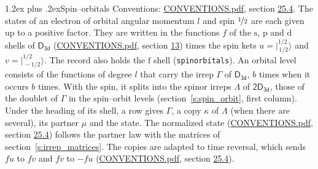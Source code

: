 \documentclass[10pt,a4paper]{article}
\makeatletter
\renewcommand\section{\@startsection{section}{1}{\z@}{-3ex plus -1ex minus -.2ex}%
  {1.2ex plus .2ex}{\normalfont\large\sffamily\bfseries\color{parttitle}}}
\numberwithin{equation}{section}
\newcommand{\grp}[1]{\mathsf{#1}}
\newcommand{\orbital}[1]{\mathrm{#1}}
\newcommand{\mult}{\kappa}
\newcommand{\intx}{\mu}
\newcommand{\jm}[2]{\bigl\lvert{}^{#1}_{\,#2}\bigr\rangle}
\makeatother
\begin{document}
\section{Spin--orbitals}\label{s:spin_orbitals}
Conventions: \href{../../CONVENTIONS.pdf}{CONVENTIONS.pdf}, section \href{../../CONVENTIONS.pdf\#conv.25.4}{25.4}.
\leavevmode\label{n:index.orbital.l}The states of an electron of orbital angular momentum $l$ and spin $\nicefrac{1}{2}$ are each given up to a positive factor. \label{n:local.spinor.uv}\label{n:local.function.f}They are written in the functions $f$ of the $\orbital{s}$, $\orbital{p}$ and $\orbital{d}$ shells of \href{../../../rotation/data/pdf/D3d.pdf}{$\grp{D_{3d}}$} (\href{../../CONVENTIONS.pdf}{CONVENTIONS.pdf}, section \href{../../../rotation/CONVENTIONS.pdf\#conv.13}{13}) times the spin kets $u = \jm{1/2}{1/2}$ and $v = \jm{1/2}{-1/2}$. The record also holds the $\orbital{f}$ shell (\texttt{spinorbitals}). An orbital level consists of the functions of degree $l$ that carry the irrep $\Gamma$ of \href{../../../rotation/data/pdf/D3d.pdf}{$\grp{D_{3d}}$}, $b$ times when it occurs $b$ times. With the spin, it splits into the spinor irreps $\Lambda$ of $\grp{2D_{3d}}$, those of the doublet of $\Gamma$ in the spin--orbit levels (section~\ref{s:spin_orbit}, first column). \label{n:head.state}Under the heading of its shell, a row gives $\Gamma$, a copy $\mult$ of $\Lambda$ (when there are several), its partner $\intx$ and the state. The normalized state (\href{../../CONVENTIONS.pdf}{CONVENTIONS.pdf}, section \href{../../CONVENTIONS.pdf\#conv.25.4}{25.4}) follows the partner law with the matrices of section~\ref{s:irrep_matrices}. The copies are adapted to time reversal, which sends $f u$ to $f v$ and $f v$ to $-f u$ (\href{../../CONVENTIONS.pdf}{CONVENTIONS.pdf}, section \href{../../CONVENTIONS.pdf\#conv.25.4}{25.4}).
\end{document}
